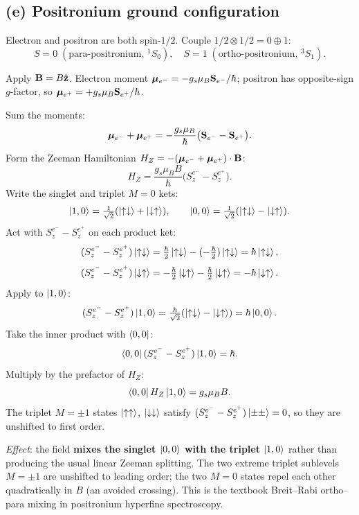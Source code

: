 \documentclass[11pt]{article}
\begin{document}
\subsection*{(e) Positronium ground configuration}

Electron and positron are both spin-$1/2$. Couple $1/2\otimes 1/2 = 0\oplus 1$:
\[
\boxed{\;S=0\;(\text{para-positronium, }{}^1S_0),\quad S=1\;(\text{ortho-positronium, }{}^3S_1).\;}
\]

Apply $\vb B = B\hat{\vb z}$. Electron moment $\bm\mu_{e^-}=-g_s\mu_B\vb S_{e^-}/\hbar$; positron has opposite-sign $g$-factor, so $\bm\mu_{e^+}=+g_s\mu_B\vb S_{e^+}/\hbar$.

Sum the moments:
\[
\bm\mu_{e^-}+\bm\mu_{e^+} = -\frac{g_s\mu_B}{\hbar}\bigl(\vb S_{e^-}-\vb S_{e^+}\bigr).
\]
Form the Zeeman Hamiltonian $H_Z=-(\bm\mu_{e^-}+\bm\mu_{e^+})\cdot\vb B$:
\[
H_Z = \frac{g_s\mu_B B}{\hbar}\bigl(S^{e^-}_z - S^{e^+}_z\bigr).
\]
Write the singlet and triplet $M=0$ kets:
\[
\ket{1,0} = \tfrac{1}{\sqrt 2}(\ket{\uparrow\downarrow}+\ket{\downarrow\uparrow}),\qquad
\ket{0,0} = \tfrac{1}{\sqrt 2}(\ket{\uparrow\downarrow}-\ket{\downarrow\uparrow}).
\]
Act with $S^{e^-}_z-S^{e^+}_z$ on each product ket:
\[
(S^{e^-}_z-S^{e^+}_z)\ket{\uparrow\downarrow} = \tfrac{\hbar}{2}\ket{\uparrow\downarrow} - (-\tfrac{\hbar}{2})\ket{\uparrow\downarrow} = \hbar\ket{\uparrow\downarrow},
\]
\[
(S^{e^-}_z-S^{e^+}_z)\ket{\downarrow\uparrow} = -\tfrac{\hbar}{2}\ket{\downarrow\uparrow} - \tfrac{\hbar}{2}\ket{\downarrow\uparrow} = -\hbar\ket{\downarrow\uparrow}.
\]
Apply to $\ket{1,0}$:
\[
(S^{e^-}_z-S^{e^+}_z)\ket{1,0} = \tfrac{\hbar}{\sqrt 2}(\ket{\uparrow\downarrow}-\ket{\downarrow\uparrow}) = \hbar\ket{0,0}.
\]
Take the inner product with $\bra{0,0}$:
\[
\bra{0,0}(S^{e^-}_z-S^{e^+}_z)\ket{1,0} = \hbar.
\]
Multiply by the prefactor of $H_Z$:
\[
\bra{0,0} H_Z \ket{1,0} = g_s\mu_B B.
\]
The triplet $M=\pm 1$ states $\ket{\uparrow\uparrow}$, $\ket{\downarrow\downarrow}$ satisfy $(S^{e^-}_z-S^{e^+}_z)\ket{\pm\pm}=0$, so they are unshifted to first order.

\textit{Effect}: the field \textbf{mixes the singlet $\ket{0,0}$ with the triplet $\ket{1,0}$} rather than producing the usual linear Zeeman splitting. The two extreme triplet sublevels $M=\pm 1$ are unshifted to leading order; the two $M=0$ states repel each other quadratically in $B$ (an avoided crossing). This is the textbook Breit--Rabi ortho--para mixing in positronium hyperfine spectroscopy.

\end{document}
